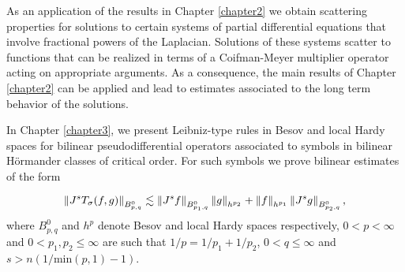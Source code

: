 As an application of the results in Chapter \ref{chapter2} we obtain scattering properties for solutions to certain systems of partial differential equations that involve fractional powers of the Laplacian. Solutions of these systems scatter to functions that can be realized in terms of a Coifman-Meyer multiplier operator acting on appropriate arguments. As a consequence, the main results of Chapter \ref{chapter2} can be applied and lead to estimates associated to the long term behavior of the solutions. 

In Chapter \ref{chapter3}, we present Leibniz-type rules in Besov and local Hardy spaces for bilinear pseudodifferential operators associated to symbols in bilinear H\"ormander classes of critical order. For such symbols we prove bilinear estimates of the form 

\begin{equation}
\left\|J^s T_\sigma(f,g)\right\|_{B^0_{p,q}} \lesssim \left\|J^s f\right\|_{B^0_{p_1,q}} \left\|g\right\|_{h^{p_2}} + \left\|f\right\|_{h^{p_1}}\left\|J^s g\right\|_{B^0_{p_2,q}},
\end{equation}
where $B^0_{p,q}$ and $h^p$ denote Besov and local Hardy spaces respectively, $0<p<\infty$ and $0<p_1,p_2\leq\infty$ are such that $1/p = 1/p_1 + 1/p_2$, $0<q\leq\infty$ and $s>n(1/\text{min}(p,1) - 1)$.



